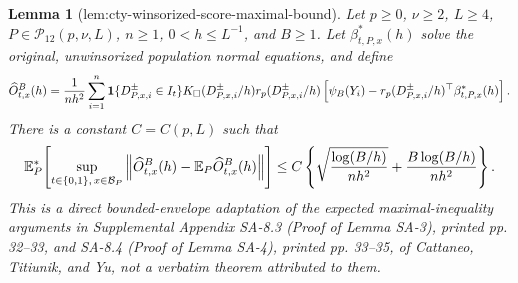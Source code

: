 \documentclass{article}
\newtheorem{lemma}{Lemma}
\begin{document}
\begin{lemma}[lem:cty-winsorized-score-maximal-bound]\label{lem:cty-winsorized-score-maximal-bound}
Let \(p\geq0\), \(\nu\geq2\), \(L\geq4\), \(P\in\mathcal P_{12}(p,\nu,L)\), \(n\geq1\), \(0<h\leq L^{-1}\), and \(B\geq1\).  Let \(\beta^*_{t,P,x}(h)\) solve the original, unwinsorized population normal equations, and define
\[
 \widehat O^B_{t,x}(h)={1\over nh^2}\sum_{i=1}^n
 \mathbf1\{D^{\pm}_{P,x,i}\in I_t\}K_\square(D^{\pm}_{P,x,i}/h)
 r_p(D^{\pm}_{P,x,i}/h)
 \left[\psi_B(Y_i)-r_p(D^{\pm}_{P,x,i}/h)^\top\beta^*_{t,P,x}(h)\right].
\]
There is a constant \(C=C(p,L)\) such that
\[
 \mathbb E_P^*\!\left[
 \sup_{t\in\{0,1\},\,x\in\mathcal B_P}
 \left\|\widehat O^B_{t,x}(h)-\mathbb E_P\widehat O^B_{t,x}(h)\right\|
 \right]
 \leq C\left\{
 \sqrt{{\log(B/h)\over nh^2}}+{B\log(B/h)\over nh^2}
 \right\}.
\]
This is a direct bounded-envelope adaptation of the expected maximal-inequality arguments in Supplemental Appendix SA-8.3 (Proof of Lemma SA-3), printed pp. 32--33, and SA-8.4 (Proof of Lemma SA-4), printed pp. 33--35, of Cattaneo, Titiunik, and Yu, not a verbatim theorem attributed to them.
\end{lemma}
\end{document}
